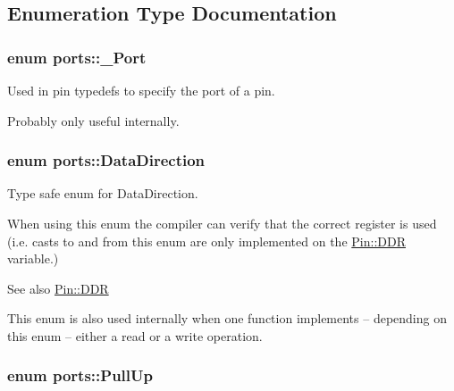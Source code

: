 \subsection{Enumeration Type Documentation}
\subsubsection[{\texorpdfstring{\+\_\+\+Port}{_Port}}]{\setlength{\rightskip}{0pt plus 5cm}enum {\bf ports\+::\+\_\+\+Port}\hspace{0.3cm}{\ttfamily [strong]}}\hypertarget{namespaceports_a9949317f344930bd6ad1097e80c97b67}{}\label{namespaceports_a9949317f344930bd6ad1097e80c97b67}


Used in pin {\ttfamily typedef}s to specify the port of a pin. 

Probably only useful internally. 
\subsubsection[{\texorpdfstring{Data\+Direction}{DataDirection}}]{\setlength{\rightskip}{0pt plus 5cm}enum {\bf ports\+::\+Data\+Direction}\hspace{0.3cm}{\ttfamily [strong]}}\hypertarget{namespaceports_a46987e78fa447129742fadda5eccafb4}{}\label{namespaceports_a46987e78fa447129742fadda5eccafb4}


Type safe enum for Data\+Direction. 

When using this enum the compiler can verify that the correct register is used (i.\+e. casts to and from this enum are only implemented on the \hyperlink{structports_1_1Pin_aaebb4d6cb5db0635fe8e7d6e7d315c7f}{Pin\+::\+D\+DR} variable.)

\begin{DoxySeeAlso}{See also}
\hyperlink{structports_1_1Pin_aaebb4d6cb5db0635fe8e7d6e7d315c7f}{Pin\+::\+D\+DR}
\end{DoxySeeAlso}
This enum is also used internally when one function implements -- depending on this enum -- either a read or a write operation. 
\subsubsection[{\texorpdfstring{Pull\+Up}{PullUp}}]{\setlength{\rightskip}{0pt plus 5cm}enum {\bf ports\+::\+Pull\+Up}\hspace{0.3cm}{\ttfamily [strong]}}\hypertarget{namespaceports_a49bf0ccedb4cfed89a328574e53bec07}{}\label{namespaceports_a49bf0ccedb4cfed89a328574e53bec07}


